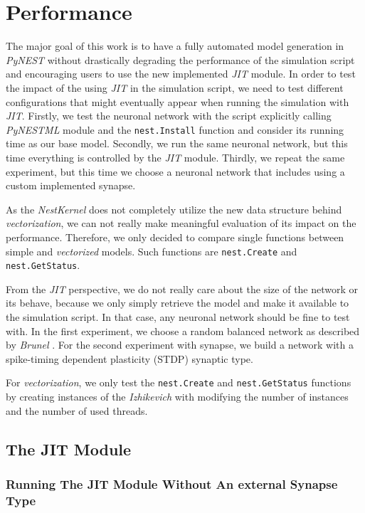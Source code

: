 \chapter{Performance}
 \label{chap:perf}
 
 The major goal of this work is to have a fully automated model generation in \emph{PyNEST} without drastically degrading the performance of the simulation script and encouraging users to use the new implemented \emph{JIT} module. In order to test the impact of the using \emph{JIT} in the simulation script, we need to test different configurations that might eventually appear when running the simulation with \emph{JIT}. Firstly, we test the neuronal network with the script explicitly calling \emph{PyNESTML} module and the \texttt{nest.Install} function and  consider its running time as our base model. Secondly, we run the same neuronal network, but this time everything is controlled by the \emph{JIT} module. Thirdly, we repeat the same experiment, but this time we choose a neuronal network that includes using a custom implemented synapse.
 
 As the \emph{NestKernel} does not completely utilize the new data structure behind \emph{vectorization}, we can not really make meaningful evaluation of its impact on the performance. Therefore, we only decided to compare single functions between simple and \emph{vectorized} models. Such functions are \texttt{nest.Create} and \texttt{nest.GetStatus}.
 
 From the \emph{JIT} perspective, we do not really care about the size of the network or its behave, because we only simply retrieve the model and make it available to the simulation script. In that case, any neuronal network should be fine to test with. In the first experiment, we choose a random balanced network as  described by \emph{Brunel} \cite{brunel2000dynamics}. For the second experiment with synapse, we build a network with a spike-timing dependent plasticity (STDP) synaptic type.
 
 
 For \emph{vectorization}, we only test the \texttt{nest.Create} and \texttt{nest.GetStatus} functions by creating instances of the \emph{Izhikevich} \cite{1257420} with modifying the number of instances and the number of used threads.
 
\section{The JIT Module}

\subsection*{Running The JIT Module Without An external Synapse Type}

